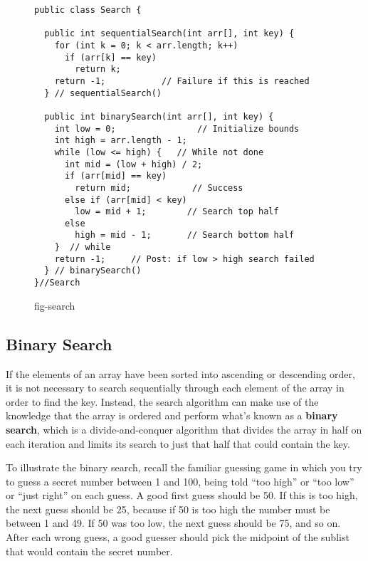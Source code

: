 \begin{figure}[bht]
\jjjprogstart
\begin{jjjlisting}
\begin{lstlisting}
public class Search {

  public int sequentialSearch(int arr[], int key) {
    for (int k = 0; k < arr.length; k++)
      if (arr[k] == key)
        return k;
    return -1;           // Failure if this is reached
  } // sequentialSearch()

  public int binarySearch(int arr[], int key) {
    int low = 0;                // Initialize bounds
    int high = arr.length - 1;
    while (low <= high) {   // While not done
      int mid = (low + high) / 2;
      if (arr[mid] == key)
        return mid;            // Success
      else if (arr[mid] < key)
        low = mid + 1;        // Search top half
      else
        high = mid - 1;       // Search bottom half
    }  // while
    return -1;     // Post: if low > high search failed
  } // binarySearch()
}//Search
\end{lstlisting}
\end{jjjlisting}
{fig-search}
\end{figure}


\subsection{Binary Search}
\noindent If the elements of an array have been sorted into ascending or
descending order, it is not necessary to search sequentially through
each element of the array in order to find the
key.  Instead, the search algorithm can make use of the knowledge that
the array is ordered and perform what's known as a {\bf
binary search}, which is a
divide-and-conquer algorithm that divides
the array in half on each iteration and limits its search to just that
half that could contain the key.

To illustrate the binary search, recall the familiar guessing game in
which you try to guess a secret number between 1 and 100, being told
``too high'' or ``too low'' or ``just right'' on each guess.   A good
first guess should be 50. If this is too high, the next guess should
be 25, because if 50 is too high the number must be between 1 and 49.
If 50 was too low, the next guess should be 75, and so on.   After each
wrong guess, a good guesser should pick the midpoint of the sublist
that would contain the secret number.

